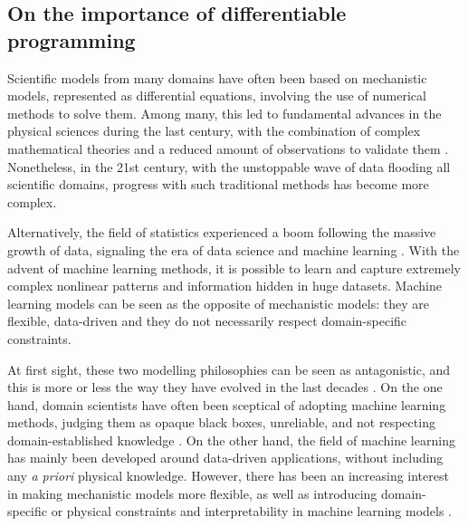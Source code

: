 \subsection{On the importance of differentiable programming}

Scientific models from many domains have often been based on mechanistic models, represented as differential equations, involving the use of numerical methods to solve them. 
Among many, this led to fundamental advances in the physical sciences during the last century, with the combination of complex mathematical theories and a reduced amount of observations to validate them
\cite{Wigner.1960, Rude:2018jv}. 
Nonetheless, in the 21st century, with the unstoppable wave of data flooding all scientific domains, progress with such traditional methods has become more complex. 

Alternatively, the field of statistics experienced a boom following the massive growth of data, signaling the era of data science and machine learning \cite{Cox:2017hv}.
With the advent of machine learning methods, it is possible to learn and capture extremely complex nonlinear patterns and information hidden in huge datasets. 
Machine learning models can be seen as the opposite of mechanistic models: they are flexible, data-driven and they do not necessarily respect domain-specific constraints.

At first sight, these two modelling philosophies can be seen as antagonistic, and this is more or less the way they have evolved in the last decades \cite{zdeborova_understanding_2020}. 
On the one hand, domain scientists have often been sceptical of adopting machine learning methods, judging them as opaque black boxes, unreliable, and not respecting domain-established knowledge \cite{Coveney:2016eb}.
On the other hand, the field of machine learning has mainly been developed around data-driven applications, without including any \textit{a priori} physical knowledge. 
However, there has been an increasing interest in making mechanistic models more flexible, as well as introducing domain-specific or physical constraints and interpretability in machine learning models \cite{Molnar.2020sisk,Rudin.2022}.

